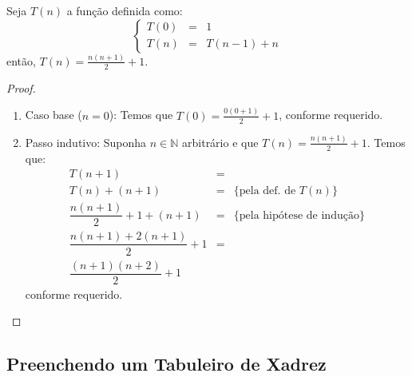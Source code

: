 \begin{Theorem}
Seja $T(n)$ a função definida como:
\[
\left\{
\begin{array}{lcl}
  T(0) & = & 1 \\
  T(n) & = & T(n - 1) + n
\end{array}
\right.
\]
então, $T(n) = \frac{n(n+1)}{2} + 1$.
\end{Theorem}
\begin{proof}
\verb| |\\
\begin{enumerate}
  \item[\ ]Caso base ($n = 0$): Temos que $T(0) = \frac{0(0 + 1)}{2} +
    1$, conforme requerido.
  \item[\ ]Passo indutivo: Suponha $n\in\mathbb{N}$ arbitrário e que
    $T(n) = \frac{n(n+1)}{2} + 1$. Temos que:
   \[
\begin{array}{lcl}
T(n + 1) & = \\
T(n) + (n + 1) & = & \{\text{pela def. de }T(n)\}\\
\dfrac{n(n+1)}{2} + 1 + (n + 1) & = & \{\text{pela hipótese de
  indução}\}\\
\dfrac{n(n + 1) + 2(n+1)}{2}  + 1& = & \\
\dfrac{(n + 1)(n + 2)}{2} + 1
\end{array}
   \]
conforme requerido.
\end{enumerate}
\end{proof}

\subsection{Preenchendo um Tabuleiro de Xadrez}

